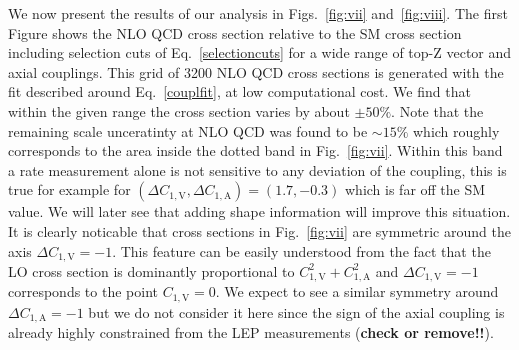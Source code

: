 \documentclass[preprint]{JHEP3} %
\def\ConeA{C_{1,\mathrm{A}}}
\def\ConeV{C_{1,\mathrm{V}}}
\begin{document}
We now present the results of our analysis in Figs.~\ref{fig:vii} and~\ref{fig:viii}.
The first Figure shows the NLO QCD cross section relative to the SM cross section 
including selection cuts of Eq.~\ref{selectioncuts} for a wide range of top-Z vector and axial couplings.
This grid of 3200 NLO QCD cross sections is generated with the fit described around Eq.~\ref{couplfit}, at low computational cost.
We find that within the given range the cross section varies by about $\pm 50\%$.
Note that the remaining scale unceratinty at NLO QCD was found to be $\sim 15\%$ which roughly corresponds to the area inside the dotted band in Fig.~\ref{fig:vii}.
Within this band a rate measurement alone is not sensitive to any deviation of the coupling, this is true for example for $(\Delta\ConeV,\Delta\ConeA)=(1.7,-0.3)$ which is far off the SM value.
We will later see that adding shape information will improve this situation.
It is clearly noticable that cross sections in Fig.~\ref{fig:vii} are symmetric around the axis $\Delta\ConeV=-1$. This feature can be easily understood
from the fact that the LO cross section is dominantly proportional to $\ConeV^2+\ConeA^2$ and $\Delta\ConeV=-1$ corresponds to the point $\ConeV=0$.
We expect to see a similar symmetry around $\Delta\ConeA=-1$ but we do not consider it here since the sign of the axial coupling is already highly constrained from 
the LEP measurements ({\bf check or remove!!}).
\end{document}
